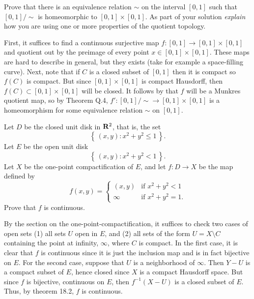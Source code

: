 \begin{problem}
  Prove that there is an equivalence relation $\sim$ on the interval
  $[0,1]$ such that $[0,1]/{\sim}$ is homeomorphic to
  $[0,1]\times[0,1]$. As part of your solution \emph{explain} how you are
  using one or more properties of the quotient topology.
\end{problem}
\begin{solution}
  First, it suffices to find a continuous surjective map
  $f\colon[0,1]\to [0,1]\times[0,1]$ and quotient out by the preimage of
  every point $x\in[0,1]\times[0,1]$. These maps are hard to describe in
  general, but they exists (take for example a space-filling curve). Next,
  note that if $C$ is a closed subset of $[0,1]$ then it is compact so
  $f(C)$ is compact. But since $[0,1]\times[0,1]$ is compact Hausdorff,
  then $f(C)\subset[0,1]\times[0,1]$ will be closed. It follows by that $f$
  will be a Munkres quotient map, so by Theorem Q.4,
  $f'\colon [0,1]/{\sim}\to[0,1]\times[0,1]$ is a homeomorphism for some
  equivalence relation $\sim$ on $[0,1]$.
\end{solution}

\begin{problem}
  Let $D$ be the closed unit disk in $\mathbf{R}^2$, that is, the set
  \[
    \left\{\,(x,y):x^2+y^2\leq 1\,\right\}.
  \]
  Let $E$ be the open unit disk
  \[
    \left\{\,(x,y):x^2+y^2<1\,\right\}.
  \]
  Let $X$ be the one-point compactification of $E$, and let
  $f\colon D\to X$ be the map defined by
  \[
    f(x,y)=
    \begin{cases}
      (x,y)&\text{if $x^2+y^2<1$}\\
      \infty&\text{if $x^2+y^2=1$.}
    \end{cases}
  \]
  Prove that $f$ is continuous.
\end{problem}
\begin{solution}
  By the section on the one-point-compactification, it suffices to check
  two cases of open sets (1) all sets $U$ open in $E$, and (2) all sets of
  the form $U=X\setminus C$ containing the point at infinity,
  $\infty$, where $C$ is compact. In the first case, it is clear that $f$
  is continuous since it is just the inclusion map and is in fact bijective
  on $E$. For the second case, suppose that $U$ is a neighborhood of
  $\infty$. Then $Y-U$ is a compact subset of $E$, hence closed since $X$
  is a compact Hausdorff space. But since $f$ is bijective, continuous on
  $E$, then $f^{-1}(X-U)$ is a closed subset of $E$. Thus, by theorem 18.2,
  $f$ is continuous.
\end{solution}

